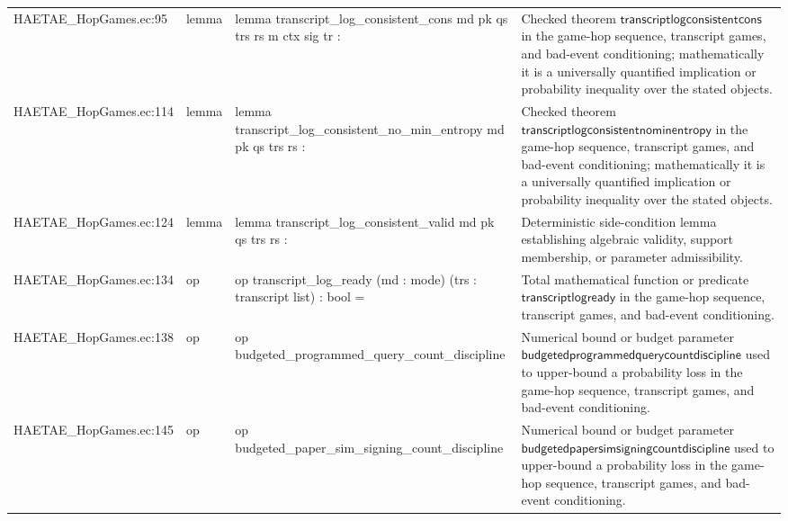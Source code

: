 \documentclass[10pt]{article}
\begin{document}
\begin{longtable}{L{0.11\textwidth}L{0.055\textwidth}L{0.385\textwidth}L{0.41\textwidth}}
HAETAE\_\allowbreak{}HopGames.\allowbreak{}ec:\allowbreak{}95 & lemma & {\ttfamily\scriptsize lemma transcript\_\allowbreak{}log\_\allowbreak{}consistent\_\allowbreak{}cons md pk qs trs rs m ctx sig tr :} & Checked theorem $\mathsf{transcriptlogconsistentcons}$ in the game-hop sequence, transcript games, and bad-event conditioning; mathematically it is a universally quantified implication or probability inequality over the stated objects. \\
HAETAE\_\allowbreak{}HopGames.\allowbreak{}ec:\allowbreak{}114 & lemma & {\ttfamily\scriptsize lemma transcript\_\allowbreak{}log\_\allowbreak{}consistent\_\allowbreak{}no\_\allowbreak{}min\_\allowbreak{}entropy md pk qs trs rs :} & Checked theorem $\mathsf{transcriptlogconsistentnominentropy}$ in the game-hop sequence, transcript games, and bad-event conditioning; mathematically it is a universally quantified implication or probability inequality over the stated objects. \\
HAETAE\_\allowbreak{}HopGames.\allowbreak{}ec:\allowbreak{}124 & lemma & {\ttfamily\scriptsize lemma transcript\_\allowbreak{}log\_\allowbreak{}consistent\_\allowbreak{}valid md pk qs trs rs :} & Deterministic side-condition lemma establishing algebraic validity, support membership, or parameter admissibility. \\
HAETAE\_\allowbreak{}HopGames.\allowbreak{}ec:\allowbreak{}134 & op & {\ttfamily\scriptsize op transcript\_\allowbreak{}log\_\allowbreak{}ready (md : mode) (trs : transcript list) : bool =} & Total mathematical function or predicate $\mathsf{transcriptlogready}$ in the game-hop sequence, transcript games, and bad-event conditioning. \\
HAETAE\_\allowbreak{}HopGames.\allowbreak{}ec:\allowbreak{}138 & op & {\ttfamily\scriptsize op budgeted\_\allowbreak{}programmed\_\allowbreak{}query\_\allowbreak{}count\_\allowbreak{}discipline} & Numerical bound or budget parameter $\mathsf{budgetedprogrammedquerycountdiscipline}$ used to upper-bound a probability loss in the game-hop sequence, transcript games, and bad-event conditioning. \\
HAETAE\_\allowbreak{}HopGames.\allowbreak{}ec:\allowbreak{}145 & op & {\ttfamily\scriptsize op budgeted\_\allowbreak{}paper\_\allowbreak{}sim\_\allowbreak{}signing\_\allowbreak{}count\_\allowbreak{}discipline} & Numerical bound or budget parameter $\mathsf{budgetedpapersimsigningcountdiscipline}$ used to upper-bound a probability loss in the game-hop sequence, transcript games, and bad-event conditioning. \\

\end{longtable}
\end{document}
